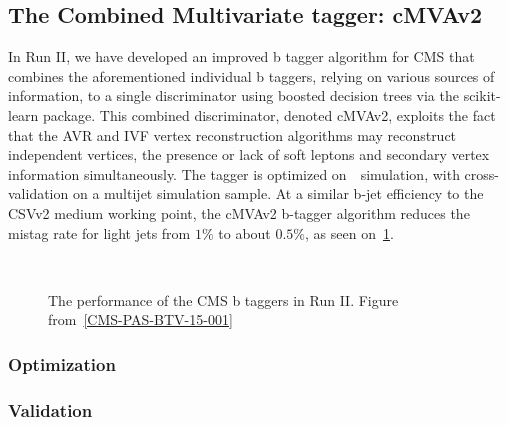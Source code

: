 \subsection{The Combined Multivariate tagger: cMVAv2}
In Run II, we have developed an improved b tagger algorithm for CMS that combines the aforementioned individual b taggers, relying on various sources of information, to a single discriminator using boosted decision trees via the scikit-learn package. This combined discriminator, denoted cMVAv2, exploits the fact that the AVR and IVF vertex reconstruction algorithms may reconstruct independent vertices, the presence or lack of soft leptons and secondary vertex information simultaneously. The tagger is optimized on~\ttbar~simulation, with cross-validation on a multijet simulation sample. At a similar b-jet efficiency to the CSVv2 medium working point, the cMVAv2 b-tagger algorithm reduces the mistag rate for light jets from $1\%$ to about $0.5\%$, as seen on~\cref{fig:btag_roc}.

\begin{figure}
\begin{centering}
 \\
\caption{The performance of the CMS b taggers in Run II. Figure from~\cref{CMS-PAS-BTV-15-001}}
\label{fig:btag_roc}
\end{centering}
\end{figure}

\subsubsection{Optimization}

\subsubsection{Validation}